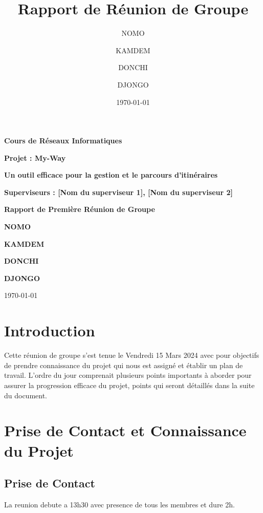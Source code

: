 \documentclass{article}
\title{Rapport de Réunion de Groupe}
\author{NOMO \and KAMDEM \and DONCHI \and DJONGO}
\date{\today}
\begin{document}
\begin{titlepage}
    \centering
    \vspace*{1cm}
    \Large\textbf{Cours de Réseaux Informatiques}\par
    \vspace{0.5cm}
    \Large\textbf{Projet : My-Way}\par
    \vspace{0.5cm}
    \Large\textbf{Un outil efficace pour la gestion et le parcours d'itinéraires}\par
    \vspace{1cm}
    \textbf{Superviseurs : [Nom du superviseur 1], [Nom du superviseur 2]}\par
    \vspace{1cm}
    \Large\textbf{Rapport de Première Réunion de Groupe}\par
    \vspace{1cm}
    \textbf{NOMO}\par
    \textbf{KAMDEM}\par
    \textbf{DONCHI}\par
    \textbf{DJONGO}\par
    \vspace{1cm}
    \today\par
    \vfill
\end{titlepage}

\tableofcontents
\clearpage


\section{Introduction}
Cette réunion de groupe s'est tenue le Vendredi 15 Mars 2024 avec pour objectifs de prendre connaissance du projet qui nous est assigné et établir un plan de travail. L'ordre du jour comprenait plusieurs points importants à aborder pour assurer la progression efficace du projet, points qui seront détaillés dans la suite du document.

\section{Prise de Contact et Connaissance du Projet}
\subsection{Prise de Contact}
La reunion debute a 13h30 avec presence de tous les membres et dure 2h.
\end{document}
